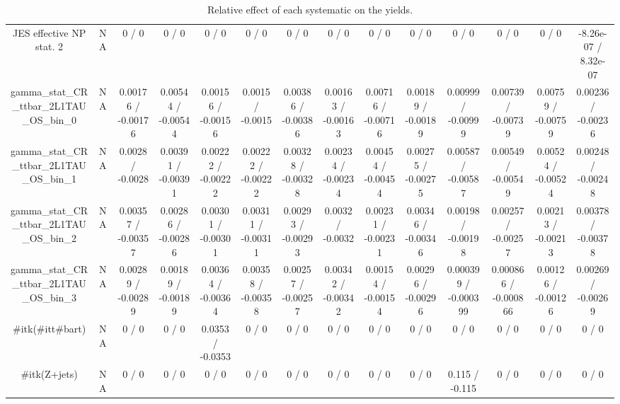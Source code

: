 \documentclass[10pt]{article}
\begin{document}
\begin{table}[htbp]
\begin{center}
\begin{tabular}{|c|c|c|c|c|c|c|c|c|c|c|c|c|c|}
  JES effective NP stat. 2 &    NA    & 0 / 0 & 0 / 0 & 0 / 0 & 0 / 0 & 0 / 0 & 0 / 0 & 0 / 0 & 0 / 0 & 0 / 0 & 0 / 0 & 0 / 0 & -8.26e-07 / 8.32e-07 \\ 
  gamma_stat_CR_ttbar_2L1TAU_OS_bin_0 &    NA    & 0.00176 / -0.00176 & 0.00544 / -0.00544 & 0.00156 / -0.00156 & 0.0015 / -0.0015 & 0.00386 / -0.00386 & 0.00163 / -0.00163 & 0.00716 / -0.00716 & 0.00189 / -0.00189 & 0.00999 / -0.00999 & 0.00739 / -0.00739 & 0.00759 / -0.00759 & 0.00236 / -0.00236 \\ 
  gamma_stat_CR_ttbar_2L1TAU_OS_bin_1 &    NA    & 0.0028 / -0.0028 & 0.00391 / -0.00391 & 0.00222 / -0.00222 & 0.00222 / -0.00222 & 0.00328 / -0.00328 & 0.00234 / -0.00234 & 0.00454 / -0.00454 & 0.00275 / -0.00275 & 0.00587 / -0.00587 & 0.00549 / -0.00549 & 0.00524 / -0.00524 & 0.00248 / -0.00248 \\ 
  gamma_stat_CR_ttbar_2L1TAU_OS_bin_2 &    NA    & 0.00357 / -0.00357 & 0.00286 / -0.00286 & 0.00301 / -0.00301 & 0.00311 / -0.00311 & 0.00293 / -0.00293 & 0.0032 / -0.0032 & 0.00231 / -0.00231 & 0.00346 / -0.00346 & 0.00198 / -0.00198 & 0.00257 / -0.00257 & 0.00213 / -0.00213 & 0.00378 / -0.00378 \\ 
  gamma_stat_CR_ttbar_2L1TAU_OS_bin_3 &    NA    & 0.00289 / -0.00289 & 0.00189 / -0.00189 & 0.00364 / -0.00364 & 0.00358 / -0.00358 & 0.00257 / -0.00257 & 0.00342 / -0.00342 & 0.00154 / -0.00154 & 0.00296 / -0.00296 & 0.000399 / -0.000399 & 0.000866 / -0.000866 & 0.00126 / -0.00126 & 0.00269 / -0.00269 \\ 
  #it{k}(#it{t#bar{t}}) &    NA    & 0 / 0 & 0 / 0 & 0.0353 / -0.0353 & 0 / 0 & 0 / 0 & 0 / 0 & 0 / 0 & 0 / 0 & 0 / 0 & 0 / 0 & 0 / 0 & 0 / 0 \\ 
  #it{k}(Z+jets) &    NA    & 0 / 0 & 0 / 0 & 0 / 0 & 0 / 0 & 0 / 0 & 0 / 0 & 0 / 0 & 0 / 0 & 0.115 / -0.115 & 0 / 0 & 0 / 0 & 0 / 0 \\ 
\hline 
\end{tabular} 
\caption{Relative effect of each systematic on the yields.} 
\end{center} 
\end{table} 
\end{document}
